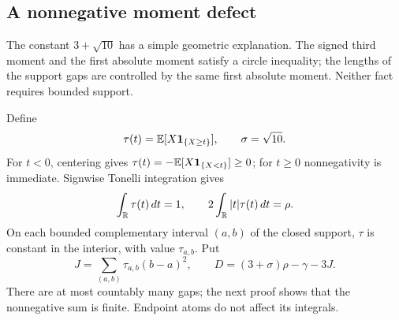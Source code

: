 \subsection{A nonnegative moment defect}

The constant $3+\sqrt{10}$ has a simple geometric explanation. The
signed third moment and the first absolute moment satisfy a circle
inequality; the lengths of the support gaps are controlled by the same
first absolute moment. Neither fact requires bounded support.

Define
\[
 \tau(t)=\mathbb E[X\mathbf1_{\{X\ge t\}}],\qquad \sigma=\sqrt{10}.
\]
For $t<0$, centering gives $\tau(t)=-\mathbb E[X\mathbf1_{\{X<t\}}]\ge0$;
for $t\ge0$ nonnegativity is immediate. Signwise Tonelli integration gives
\begin{equation}
 \int_\mathbb R\tau(t)\,dt=1,
 \qquad 2\int_\mathbb R|t|\tau(t)\,dt=\rho.
\label{ms:tau-moments}
\end{equation}
On each bounded complementary interval $(a,b)$ of the closed support,
$\tau$ is constant in the interior, with value $\tau_{a,b}$. Put
\begin{equation}
 J=\sum_{(a,b)}\tau_{a,b}(b-a)^2,
 \qquad D=(3+\sigma)\rho-\gamma-3J.
\label{ms:physical-defect-definition}
\end{equation}
There are at most countably many gaps; the next proof shows that the
nonnegative sum is finite. Endpoint atoms do not affect its integrals.

